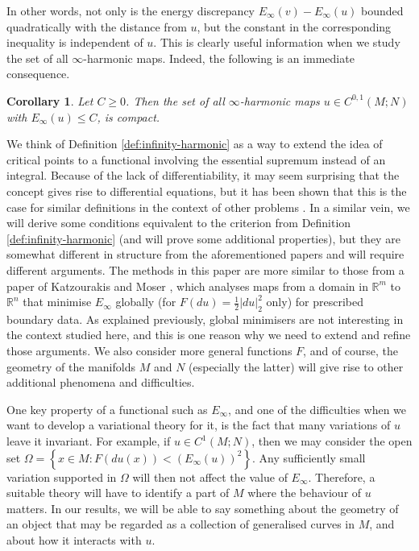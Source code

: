 \documentclass[10pt,a4paper]{amsart}
\newcommand{\R}{\mathbb{R}}
\newcommand{\set}[2]{\left\{ #1 \colon #2 \right\}}
\newtheorem{corollary}[theorem]{Corollary}
\begin{document}
In other words, not only is the energy discrepancy $E_\infty(v) - E_\infty(u)$ bounded quadratically
with the distance from $u$, but the constant in the corresponding inequality is independent of $u$.
This is clearly useful information when we study the set of all $\infty$-harmonic maps.
Indeed, the following is an immediate consequence.

\begin{corollary} \label{cor:compact}
Let $C \ge 0$. Then the set of all $\infty$-harmonic maps $u \in C^{0, 1}(M; N)$ with
$E_\infty(u) \le C$, is compact.
\end{corollary}

We think of Definition \ref{def:infinity-harmonic} as a way to extend the idea of critical points to a functional
involving the essential supremum instead of an integral. Because of the lack of differentiability,
it may seem surprising that the concept gives rise to differential
equations, but it has been shown that this is the case for similar definitions in the context of
other problems \cite{Moser:22, Katzourakis-Moser:23, Gallagher-Moser:23, Gallagher-Moser:24}.
In a similar vein, we will derive some conditions equivalent to the criterion
from Definition \ref{def:infinity-harmonic} (and will prove
some additional properties), but they are somewhat different in structure
from the aforementioned papers and will require
different arguments. The methods in this paper are more similar to those
from  a paper of Katzourakis and Moser \cite{Katzourakis-Moser:25},
which analyses maps from a domain in $\R^m$ to $\R^n$ that minimise
$E_\infty$ globally (for $F(du) = \frac{1}{2}|du|_2^2$ only) for prescribed boundary data.
As explained previously, global minimisers are not interesting in the
context studied here, and this is one reason why we need to extend and refine
those arguments. We also consider more general functions $F$, and of course,
the geometry of the manifolds $M$ and $N$ (especially the latter)
will give rise to other additional phenomena and difficulties.

One key property of a functional such as $E_\infty$, and one of the difficulties
when we want to develop a variational theory for it, is the fact that
many variations of $u$ leave it invariant. For example, if $u \in C^1(M; N)$,
then we may consider the open set $\Omega = \set{x \in M}{F(du(x)) < (E_\infty(u))^2}$.
Any sufficiently small variation supported in $\Omega$ will then not affect
the value of $E_\infty$. Therefore, a suitable theory will have to
identify a part of $M$ where the behaviour of $u$ matters. In our results, we will be able to say something
about the geometry of an object that may be regarded as a collection of
generalised curves in $M$, and about how it interacts with $u$.
\end{document}

